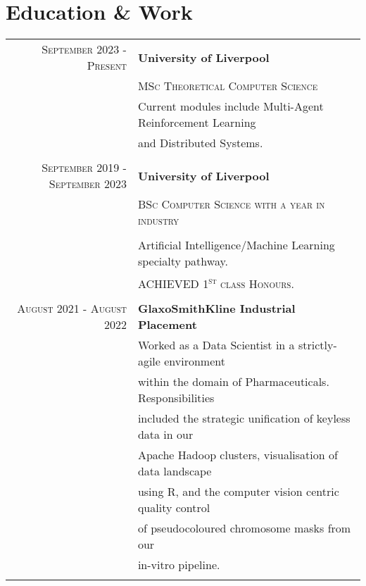 \documentclass[a4paper,10pt]{article} %
\begin{document}

\section{Education \& Work}

\begin{tabular}{rl}	
\textsc{September} 2023 - \textsc{Present} & \textbf{University of Liverpool} \\
&\normalsize \textsc{MSc Theoretical Computer Science} \\
&\normalsize Current modules include Multi-Agent Reinforcement Learning \\
& and Distributed Systems. \\
&\\
\textsc{September} 2019 - \textsc{September} 2023 & \textbf{University of Liverpool} \\
&\normalsize \textsc{BSc Computer Science with a year in industry} \\
& \\
&\normalsize Artificial Intelligence/Machine Learning specialty pathway. \\
&\textsc{ACHIEVED 1\textsuperscript{st} class Honours.} \\
&\\

\textsc{August} 2021 - \textsc{August} 2022 & \textbf{GlaxoSmithKline Industrial Placement} \\
&\normalsize Worked as a Data Scientist in a strictly-agile environment \\
& within the domain of Pharmaceuticals. Responsibilities \\
& included the strategic unification of keyless data in our \\
& Apache Hadoop clusters, visualisation of data landscape \\
& using R, and the computer vision centric quality control \\
& of pseudocoloured chromosome masks from our \\
& in-vitro pipeline. \\
&\\


\end{tabular}
\end{document}
